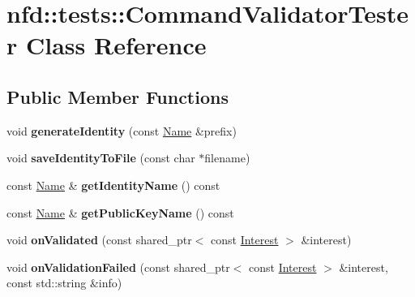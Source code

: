 \hypertarget{classnfd_1_1tests_1_1CommandValidatorTester}{}\section{nfd\+:\+:tests\+:\+:Command\+Validator\+Tester Class Reference}
\label{classnfd_1_1tests_1_1CommandValidatorTester}
\subsection*{Public Member Functions}
\begin{DoxyCompactItemize}
\item 
void {\bfseries generate\+Identity} (const \hyperlink{classndn_1_1Name}{Name} \&prefix)\hypertarget{classnfd_1_1tests_1_1CommandValidatorTester_a8c2adf875c278cef0e4febc94706e666}{}\label{classnfd_1_1tests_1_1CommandValidatorTester_a8c2adf875c278cef0e4febc94706e666}

\item 
void {\bfseries save\+Identity\+To\+File} (const char $\ast$filename)\hypertarget{classnfd_1_1tests_1_1CommandValidatorTester_a54abcf322612201ef42eba7e130d074f}{}\label{classnfd_1_1tests_1_1CommandValidatorTester_a54abcf322612201ef42eba7e130d074f}

\item 
const \hyperlink{classndn_1_1Name}{Name} \& {\bfseries get\+Identity\+Name} () const\hypertarget{classnfd_1_1tests_1_1CommandValidatorTester_ae0fc365dbcecfe883dd7be0e8d2980d0}{}\label{classnfd_1_1tests_1_1CommandValidatorTester_ae0fc365dbcecfe883dd7be0e8d2980d0}

\item 
const \hyperlink{classndn_1_1Name}{Name} \& {\bfseries get\+Public\+Key\+Name} () const\hypertarget{classnfd_1_1tests_1_1CommandValidatorTester_a84c8d430e6344d887f1c20a7d8dbc8a2}{}\label{classnfd_1_1tests_1_1CommandValidatorTester_a84c8d430e6344d887f1c20a7d8dbc8a2}

\item 
void {\bfseries on\+Validated} (const shared\+\_\+ptr$<$ const \hyperlink{classndn_1_1Interest}{Interest} $>$ \&interest)\hypertarget{classnfd_1_1tests_1_1CommandValidatorTester_aaaaeaa06beec2d9c37a321a4643da6f9}{}\label{classnfd_1_1tests_1_1CommandValidatorTester_aaaaeaa06beec2d9c37a321a4643da6f9}

\item 
void {\bfseries on\+Validation\+Failed} (const shared\+\_\+ptr$<$ const \hyperlink{classndn_1_1Interest}{Interest} $>$ \&interest, const std\+::string \&info)\hypertarget{classnfd_1_1tests_1_1CommandValidatorTester_a09e22e317c934511a48a0ea815170ce3}{}\label{classnfd_1_1tests_1_1CommandValidatorTester_a09e22e317c934511a48a0ea815170ce3}


\end{DoxyCompactItemize}
